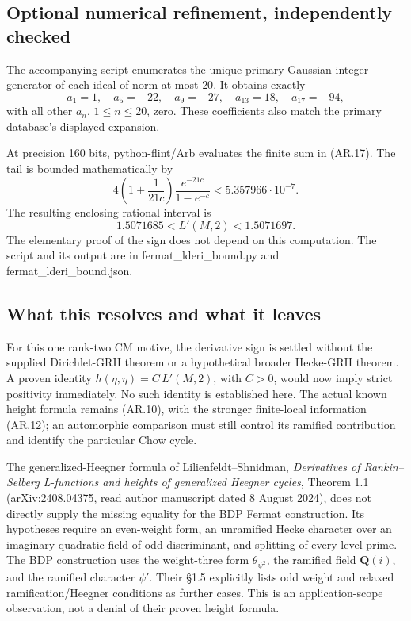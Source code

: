 \subsection{Optional numerical refinement, independently
checked}\label{optional-numerical-refinement-independently-checked}

The accompanying script enumerates the unique primary Gaussian-integer
generator of each ideal of norm at most \(20\). It obtains exactly \[
a_1=1,\quad a_5=-22,\quad a_9=-27,\quad a_{13}=18,\quad a_{17}=-94,
\] with all other \(a_n\), \(1\le n\le20\), zero. These coefficients
also match the primary database's displayed expansion.

At precision 160 bits, python-flint/Arb evaluates the finite sum in
(AR.17). The tail is bounded mathematically by \[
4\left(1+\frac1{21c}\right)\frac{e^{-21c}}{1-e^{-c}}
 <5.357966\cdot10^{-7}.
\] The resulting enclosing rational interval is \[
1.5071685<L'(M,2)<1.5071697.
\tag{AR.18}
\] The elementary proof of the sign does not depend on this computation.
The script and its output are in fermat\_lderi\_bound.py and
fermat\_lderi\_bound.json.

\subsection{What this resolves and what it
leaves}\label{what-this-resolves-and-what-it-leaves}

For this one rank-two CM motive, the derivative sign is settled without
the supplied Dirichlet-GRH theorem or a hypothetical broader Hecke-GRH
theorem. A proven identity \(h(\eta,\eta)=C\,L'(M,2)\), with \(C>0\),
would now imply strict positivity immediately. No such identity is
established here. The actual known height formula remains (AR.10), with
the stronger finite-local information (AR.12); an automorphic comparison
must still control its ramified contribution and identify the particular
Chow cycle.

The generalized-Heegner formula of Lilienfeldt--Shnidman,
\emph{Derivatives of Rankin--Selberg L-functions and heights of
generalized Heegner cycles}, Theorem 1.1 (arXiv:2408.04375, read author
manuscript dated 8 August 2024), does not directly supply the missing
equality for the BDP Fermat construction. Its hypotheses require an
even-weight form, an unramified Hecke character over an imaginary
quadratic field of odd discriminant, and splitting of every level prime.
The BDP construction uses the weight-three form \(\theta_{\psi^2}\), the
ramified field \(\mathbf Q(i)\), and the ramified character \(\psi'\).
Their §1.5 explicitly lists odd weight and relaxed ramification/Heegner
conditions as further cases. This is an application-scope observation,
not a denial of their proven height formula.

